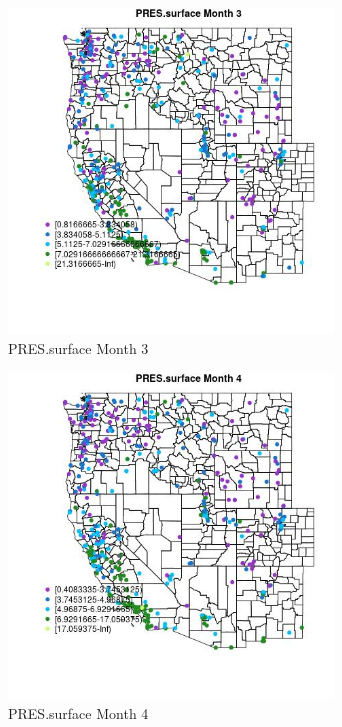 \begin{figure} 
\centering  
\includegraphics[width=0.77\textwidth]{Code_Outputs/ML_input_report_ML_input_PM25_Step5_part_d_de_duplicated_aves_ML_input_MapObsMo3PRESsurface.jpg} 
\caption{\label{fig:ML_input_report_ML_input_PM25_Step5_part_d_de_duplicated_aves_ML_inputMapObsMo3PRESsurface}PRES.surface Month 3} 
\end{figure} 
 

\begin{figure} 
\centering  
\includegraphics[width=0.77\textwidth]{Code_Outputs/ML_input_report_ML_input_PM25_Step5_part_d_de_duplicated_aves_ML_input_MapObsMo4PRESsurface.jpg} 
\caption{\label{fig:ML_input_report_ML_input_PM25_Step5_part_d_de_duplicated_aves_ML_inputMapObsMo4PRESsurface}PRES.surface Month 4} 
\end{figure} 
 

